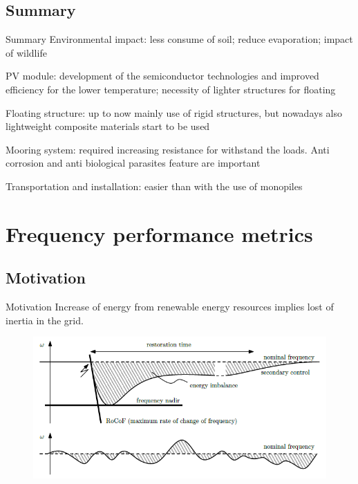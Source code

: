 \documentclass[aspectratio=169, 12pt]{beamer}
\begin{document}
\subsection{Summary}
\begin{frame}{Summary}
  \textcolor{NTNUBlue}{Environmental impact}: less consume of soil; reduce evaporation; impact of wildlife

  \textcolor{NTNUBlue}{PV module}: development of the semiconductor technologies and improved efficiency for the lower temperature; necessity of lighter structures for floating
  
  \textcolor{NTNUBlue}{Floating structure}: up to now mainly use of rigid structures, but nowadays also lightweight composite materials start to be used

  \textcolor{NTNUBlue}{Mooring system}: required increasing resistance for withstand the loads. Anti corrosion and anti biological parasites feature are important

  \textcolor{NTNUBlue}{Transportation and installation}: easier than with the use of monopiles

\end{frame}

                                  

\section{Frequency performance metrics}
\subsection{Motivation}
\begin{frame}{Motivation}{\insertsection}
  Increase of energy from renewable energy resources implies lost of inertia in the grid.
  \begin{figure}
    \centering
    \includegraphics[width=0.5\columnwidth]{figure/frequency_disturbance.png}
  \end{figure} 
\end{frame}
\end{document}
